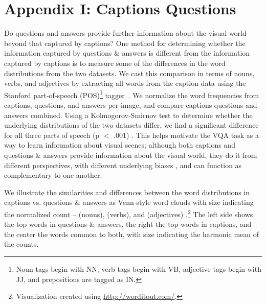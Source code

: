 \section*{Appendix I: Captions \vs Questions}
\label{sec:cap_vs_q}
Do questions and answers provide further information about the visual world beyond that captured by captions? One method for determining whether the information captured by questions \& answers is different from the information captured by captions is to measure some of the differences in the word distributions from the two datasets. We cast this comparison in terms of nouns, verbs, and adjectives by extracting all words from the caption data  using the Stanford part-of-speech (POS)\footnote{Noun tags begin with NN, verb tags begin with VB, adjective tags begin with JJ, and prepositions are tagged as IN.} tagger~\cite{StanfordPOS}.  We normalize the word frequencies from captions, questions, and answers per image, and compare captions \vs questions and answers combined.  Using a Kolmogorov-Smirnov test to determine whether the underlying distributions of the two datasets differ, we find a significant difference for all three parts of speech (p $<$ .001) . This helps motivate the VQA task as a way to learn information about visual scenes; although both captions and questions \& answers provide information about the visual world, they do it from different perspectives, with different underlying biases \cite{GordonVanDurme13}, and can function as complementary to one another.  %

We illustrate the similarities and differences between the word distributions in captions vs. questions \& answers as Venn-style word clouds \cite{CoppersmithKelly14} with size indicating the normalized count --  (nouns),  (verbs), and  (adjectives) .\footnote{Visualization created using \url{http://worditout.com/}.}  The left side shows the top words in questions \& answers, the right the top words in captions, and the center the words common to both, with size indicating the harmonic mean of the counts.


